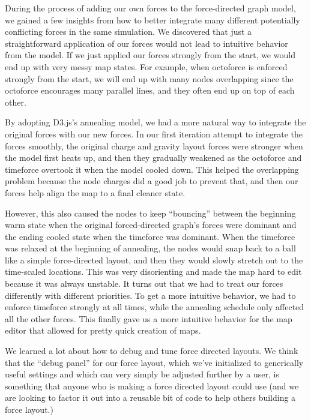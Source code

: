 \documentclass{chi2009}
\begin{document}
During the process of adding our own forces to the force-directed graph model, we gained a few insights from how to better integrate many different potentially conflicting forces in the same simulation.  We discovered that just a straightforward application of our forces would not lead to intuitive behavior from the model.  If we just applied our forces strongly from the start, we would end up with very messy map states.  For example, when octoforce is enforced strongly from the start, we will end up with many nodes overlapping since the octoforce encourages many parallel lines, and they often end up on top of each other.  

By adopting D3.js’s annealing model, we had a more natural way to integrate the original forces with our new forces.  In our first iteration attempt to integrate the forces smoothly, the original charge and gravity layout forces were stronger when the model first heats up, and then they gradually weakened as the octoforce and timeforce overtook it when the model cooled down.  This helped the overlapping problem because the node charges did a good job to prevent that, and then our forces help align the map to a final cleaner state.  

However, this also caused the nodes to keep “bouncing” between the beginning warm state when the original forced-directed graph’s forces were dominant and the ending cooled state when the timeforce was dominant.  When the timeforce was relaxed at the beginning of annealing, the nodes would snap back to a ball like a simple force-directed layout, and then they would slowly stretch out to the time-scaled locations.  This was very disorienting and made the map hard to edit because it was always unstable.  
    It turns out that we had to treat our forces differently with different priorities.  To get a more intuitive behavior, we had to enforce timeforce strongly at all times, while the annealing schedule only affected all the other forces.  This finally gave us a more intuitive behavior for the map editor that allowed for pretty quick creation of maps.  

We learned a lot about how to debug and tune force directed layouts. We think that the “debug panel” for our force layout, which we’ve initialized to generically useful settings and which can very simply be adjusted further by a user, is something that anyone who is making a force directed layout could use (and we are looking to factor it out into a reusable bit of code to help others building a force layout.)
\end{document}
